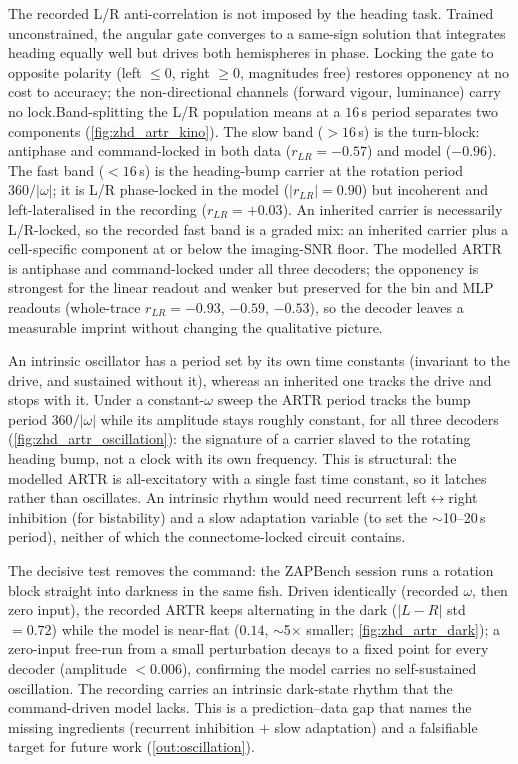 \documentclass[11pt]{article}
\begin{document}
The recorded L/R anti-correlation is not imposed by the heading task. Trained
unconstrained, the angular gate converges to a same-sign solution that
integrates heading equally well but drives both hemispheres in phase. Locking
the gate to opposite polarity (left $\le 0$, right $\ge 0$, magnitudes free)
restores opponency at no cost to accuracy; the non-directional channels
(forward vigour, luminance) carry no lock.Band-splitting the L/R population means at a $16$\,s period separates two
components (\cref{fig:zhd_artr_kino}). The slow band ($>16$\,s) is the
turn-block: antiphase and command-locked in both data ($r_{LR}=-0.57$) and
model ($-0.96$). The fast band ($<16$\,s) is the heading-bump carrier at the
rotation period $360/|\omega|$; it is L/R phase-locked in the model
($|r_{LR}|=0.90$) but incoherent and left-lateralised in the recording
($r_{LR}=+0.03$). An inherited carrier is necessarily L/R-locked, so the
recorded fast band is a graded mix: an inherited carrier plus a
cell-specific component at or below the imaging-SNR floor. The modelled ARTR
is antiphase and command-locked under all three decoders; the opponency is
strongest for the linear readout and weaker but preserved for the bin and MLP
readouts (whole-trace $r_{LR}=-0.93$, $-0.59$, $-0.53$), so the decoder leaves
a measurable imprint without changing the qualitative picture. 

An intrinsic oscillator has a period set by its own time constants
(invariant to the drive, and sustained without it), whereas an inherited one
tracks the drive and stops with it. Under a constant-$\omega$ sweep the ARTR
period tracks the bump period $360/|\omega|$ while its amplitude stays roughly
constant, for all three decoders (\cref{fig:zhd_artr_oscillation}): the
signature of a carrier slaved to the rotating heading bump, not a clock with
its own frequency. This is structural: the modelled ARTR is all-excitatory
with a single fast time constant, so it latches rather than oscillates. An
intrinsic rhythm would need recurrent left$\leftrightarrow$right inhibition
(for bistability) and a slow adaptation variable (to set the $\sim$10--20\,s
period), neither of which the connectome-locked circuit contains.

The decisive test removes the command: the ZAPBench session runs a rotation
block straight into darkness in the same fish. Driven identically (recorded
$\omega$, then zero input), the recorded ARTR keeps alternating in the dark
($|L-R|$ std $=0.72$) while the model is near-flat ($0.14$,
$\sim$5$\times$ smaller; \cref{fig:zhd_artr_dark}); a zero-input free-run from
a small perturbation decays to a fixed point for every decoder
(amplitude $<0.006$), confirming the model carries no self-sustained
oscillation. The recording carries an intrinsic dark-state rhythm
\citep{dunn2016artr} that the command-driven model lacks. This is a
prediction--data gap that names the missing ingredients (recurrent inhibition
$+$ slow adaptation) and a falsifiable target for future work
(\cref{out:oscillation}).
\end{document}
